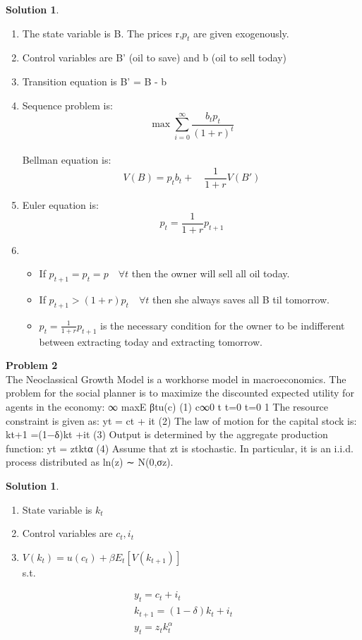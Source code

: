 \documentclass[letterpaper,12pt]{article}
\theoremstyle{definition}
\newtheorem{solution}[theorem]{Solution}
\begin{document}
\begin{solution} ~\\
  \begin{enumerate}
  \item The state variable is B. The prices r,$p_t$ are given exogenously.
  \item Control variables are B' (oil to save) and b (oil to sell today)
  \item Transition equation is B' = B - b
  \item Sequence problem is: \[ \max \sum_{i=0}^\infty \frac{b_tp_t}{(1+r)^t} \] \\
  Bellman equation is:
  \[ V(B) = p_tb_t + \quad \frac{1}{1+r} V(B')\]
  \item Euler equation is: \[ p_t = \frac{1}{1+r}p_{t+1}
  \]
  \item
  \begin{itemize}
    \item If $p_{t+1}=p_t=p \quad \forall t$ then the owner will sell all oil today.
    \item If $p_{t+1} > (1+r) p_t \quad \forall t$ then she always saves all B til tomorrow.
    \item $p_t = \frac{1}{1+r}p_{t+1}$ is the necessary condition for the owner to be indifferent between extracting today and extracting tomorrow.
  \end{itemize}
  \end{enumerate}
\end{solution}

\noindent\textbf{Problem 2} ~\\
The Neoclassical Growth Model is a workhorse model in macroeconomics. The problem for the social planner is to maximize the discounted expected utility for agents in the economy:
∞
 maxE  βtu(c) (1) {c}∞0 t
t=0 t=0 1
The resource constraint is given as:
yt = ct + it (2) The law of motion for the capital stock is:
kt+1 =(1−δ)kt +it (3) Output is determined by the aggregate production function:
yt = ztktα (4) Assume that zt is stochastic. In particular, it is an i.i.d. process distributed as ln(z) ∼
N(0,σz).


\begin{solution} ~\\
  \begin{enumerate}
  \item State variable is $k_t$
  \item Control variables are $c_t,i_t$
  \item $V(k_t) = u(c_t) + \beta E_t[V(k_{t+1})]$ \\ s.t.
  \end{enumerate}
  \begin{gather}
    y_t = c_t + i_t \\
    k_{t+1} = (1- \delta)k_t + i_t \\
    y_t = z_tk_t^\alpha
  \end{gather}
\end{solution}
\end{document}
